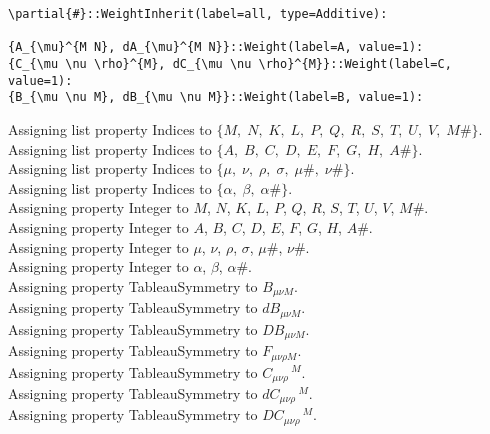 \documentclass[11pt]{article}
\begin{document}
{\begin{verbatim}
\partial{#}::WeightInherit(label=all, type=Additive):

{A_{\mu}^{M N}, dA_{\mu}^{M N}}::Weight(label=A, value=1):
{C_{\mu \nu \rho}^{M}, dC_{\mu \nu \rho}^{M}}::Weight(label=C, value=1):
{B_{\mu \nu M}, dB_{\mu \nu M}}::Weight(label=B, value=1):
\end{verbatim}}
Assigning list property Indices to $\{M,\; N,\; K,\; L,\; P,\; Q,\; R,\; S,\; T,\; U,\; V,\; M\#\}$.
\\
Assigning list property Indices to $\{A,\; B,\; C,\; D,\; E,\; F,\; G,\; H,\; A\#\}$.
\\
Assigning list property Indices to $\{\mu,\; \nu,\; \rho,\; \sigma,\; \mu\#,\; \nu\#\}$.
\\
Assigning list property Indices to $\{\alpha,\; \beta,\; \alpha\#\}$.
\\
Assigning property Integer to $M$, $N$, $K$, $L$, $P$, $Q$, $R$, $S$, $T$, $U$, $V$, $M\#$.
\\
Assigning property Integer to $A$, $B$, $C$, $D$, $E$, $F$, $G$, $H$, $A\#$.
\\
Assigning property Integer to $\mu$, $\nu$, $\rho$, $\sigma$, $\mu\#$, $\nu\#$.
\\
Assigning property Integer to $\alpha$, $\beta$, $\alpha\#$.
\\
Assigning property TableauSymmetry to ${B}_{\mu \nu M}$.
\\
Assigning property TableauSymmetry to ${dB}_{\mu \nu M}$.
\\
Assigning property TableauSymmetry to ${DB}_{\mu \nu M}$.
\\
Assigning property TableauSymmetry to ${F}_{\mu \nu \rho M}$.
\\
Assigning property TableauSymmetry to ${C}_{\mu \nu \rho}\,^{M}$.
\\
Assigning property TableauSymmetry to ${dC}_{\mu \nu \rho}\,^{M}$.
\\
Assigning property TableauSymmetry to ${DC}_{\mu \nu \rho}\,^{M}$.
\\
\end{document}
